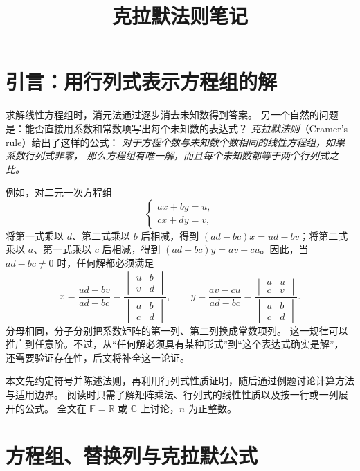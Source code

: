 \documentclass[UTF8,12pt,a4paper,fontset=fandol]{ctexart}
\title{克拉默法则笔记}
\author{}
\date{}
\begin{document}
\maketitle

\section{引言：用行列式表示方程组的解}

求解线性方程组时，消元法通过逐步消去未知数得到答案。
另一个自然的问题是：能否直接用系数和常数项写出每个未知数的表达式？
\emph{克拉默法则}（Cramer's rule）给出了这样的公式：
\emph{对于方程个数与未知数个数相同的线性方程组，如果系数行列式非零，
那么方程组有唯一解，而且每个未知数都等于两个行列式之比。}

例如，对二元一次方程组
\[
  \begin{cases}
    ax+by=u,\\
    cx+dy=v,
  \end{cases}
\]
将第一式乘以 $d$、第二式乘以 $b$ 后相减，得到
$(ad-bc)x=ud-bv$；将第二式乘以 $a$、第一式乘以 $c$ 后相减，得到
$(ad-bc)y=av-cu$。因此，当 $ad-bc\ne0$ 时，任何解都必须满足
\[
  x=\frac{ud-bv}{ad-bc}
   =\frac{\begin{vmatrix}u&b\\v&d\end{vmatrix}}
          {\begin{vmatrix}a&b\\c&d\end{vmatrix}},
  \qquad
  y=\frac{av-cu}{ad-bc}
   =\frac{\begin{vmatrix}a&u\\c&v\end{vmatrix}}
          {\begin{vmatrix}a&b\\c&d\end{vmatrix}}.
\]
分母相同，分子分别把系数矩阵的第一列、第二列换成常数项列。
这一规律可以推广到任意阶。不过，从“任何解必须具有某种形式”到“这个表达式确实是解”，
还需要验证存在性，后文将补全这一论证。

本文先约定符号并陈述法则，再利用行列式性质证明，随后通过例题讨论计算方法与适用边界。
阅读时只需了解矩阵乘法、行列式的线性性质以及按一行或一列展开的公式。
全文在 $\mathbb F=\mathbb R$ 或 $\mathbb C$ 上讨论，$n$ 为正整数。

\section{方程组、替换列与克拉默公式}
\end{document}
